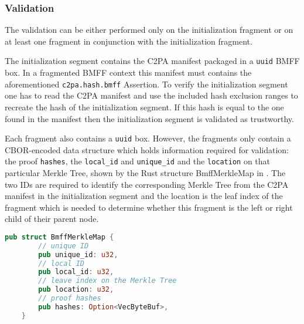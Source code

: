 \subsubsection{Validation}

The validation can be either performed only on the initialization fragment or on at least one fragment in conjunction with the initialization fragment.

The initialization segment contains the C2PA manifest packaged in a \texttt{uuid} BMFF box. In a fragmented BMFF context this manifest must contains the aforementioned \texttt{c2pa.hash.bmff} Assertion. To verify the initialization segment one has to read the C2PA manifest and use the included hash exclusion ranges to recreate the hash of the initialization segment. If this hash is equal to the one found in the manifest then the initialization segment is validated as trustworthy.

Each fragment also contains a \texttt{uuid} box. However, the fragments only contain a CBOR-encoded data structure which holds information required for validation: the proof \texttt{hashes}, the \texttt{local\_id} and \texttt{unique\_id} and the \texttt{location} on that particular Merkle Tree, shown by the Rust structure BmffMerkleMap in . The two IDs are required to identify the corresponding Merkle Tree from the C2PA manifest in the initialization segment and the location is the leaf index of the fragment which is needed to determine whether this fragment is the left or right child of their parent node.

\begin{minipage}{\linewidth}
\begin{lstlisting}[caption={BmffMerkleMap Rust Definition}, label=code:bmff_merkle, language=Rust, captionpos=b]
    pub struct BmffMerkleMap {
        // unique ID
        pub unique_id: u32,
        // local ID
        pub local_id: u32,
        // leave index on the Merkle Tree
        pub location: u32,
        // proof hashes
        pub hashes: Option<VecByteBuf>,
    }
\end{lstlisting}
\end{minipage}

